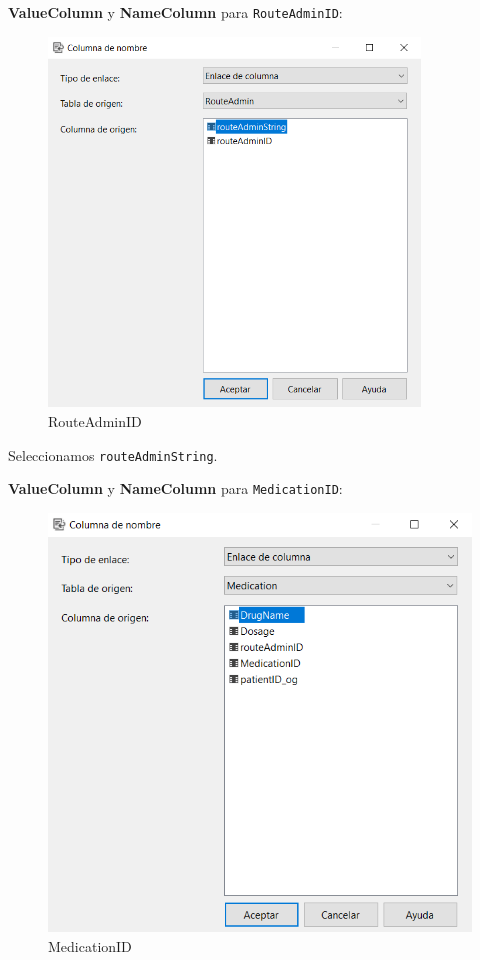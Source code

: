 \documentclass[12pt, a4paper, twoside]{article}
\begin{document}
\textbf{ValueColumn} y \textbf{NameColumn} para \texttt{RouteAdminID}:

\begin{figure}[H]
	\centering
	\includegraphics[width=0.88\textwidth]{image/routeAdmin}
	\caption{RouteAdminID}
	\label{fig:23}
\end{figure}

Seleccionamos \texttt{routeAdminString}.

\textbf{ValueColumn} y \textbf{NameColumn} para \texttt{MedicationID}:

\begin{figure}[H]
	\centering
	\includegraphics[width=1\textwidth]{image/MedicationID}
	\caption{MedicationID}
	\label{fig:24}
\end{figure}
\end{document}
